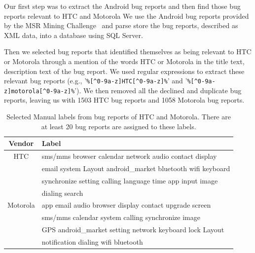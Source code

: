 \documentclass[10pt, conference, compsocconf]{IEEEtran}
\begin{document}


Our first step was to extract the Android bug reports and then find
those bug reports relevant to HTC and Motorola
We use the Android bug reports provided by the MSR Mining
Challenge~\cite{MSRChallenge2012}
and parse store the bug reports, described as XML data, into a
database using SQL
Server. 

Then we selected bug reports that identified themselves as being
relevant to HTC or Motorola through a mention of the words HTC or
Motorola in the title text, description text of the bug report.  
We used regular expressions to extract these relevant bug reports (e.g.,
'\texttt{\%[^0-9a-z]HTC[^0-9a-z]\%}' and
'\texttt{\%[^0-9a-z]motorola[^0-9a-z]\%}').
We then removed all the declined and duplicate bug reports, leaving us
with 1503 HTC bug reports and 1058 Motorola bug reports.

\begin{table}[!t]
\renewcommand{\arraystretch}{1.3}
\caption{Selected Manual labels from bug reports of HTC and Motorola. There are at least 20 bug reports are assigned to these labels.}
\label{selected1}
\centering
\begin{tabular}{|c||l|}
\hline
Vendor & Label\\
\hline
HTC & sms\//mms browser calendar network audio contact display \\ 
  & email system Layout android\_market bluetooth wifi keyboard\\
  & synchronize setting calling language time app input image\\
  & dialing search\\
\hline
Motorola & app email audio browser display contact upgrade screen\\
    &sms\//mms calendar system calling synchronize image \\
    &GPS android\_market setting network keyboard lock Layout \\
    &notification dialing wifi bluetooth\\
\hline
\end{tabular}
\end{table}
\end{document}
